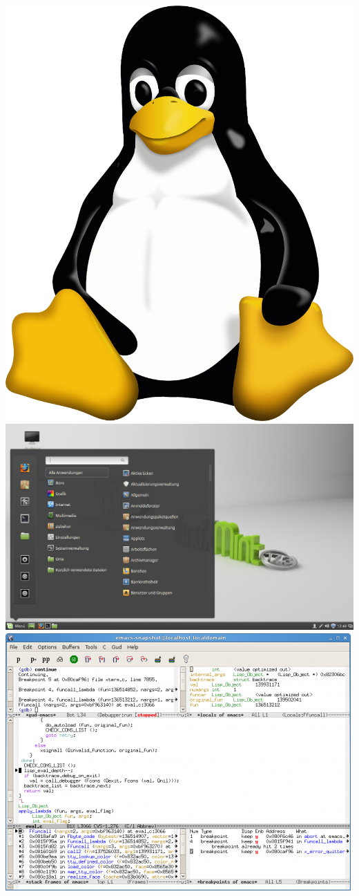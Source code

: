 \documentclass[a4paper,ngerman,landscape,12pt]{scrartcl}
\begin{document}
\begin{center}
  \Huge
  \includegraphics[height=0.2\textheight]{tux}\quad
  \includegraphics[height=0.2\textheight]{linux-mint}\quad
  \includegraphics[height=0.2\textheight]{linux-developing}\quad

\end{center}
\end{document}
